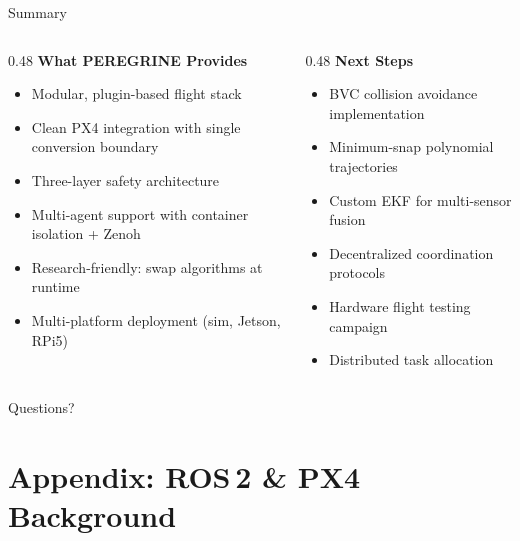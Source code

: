 \documentclass[aspectratio=169, 10pt]{beamer}
\begin{document}
\begin{frame}{Summary}
\begin{columns}[T]
\begin{column}{0.48\textwidth}
\textbf{What PEREGRINE Provides}
\begin{itemize}
  \item Modular, plugin-based flight stack
  \item Clean PX4 integration with single conversion boundary
  \item Three-layer safety architecture
  \item Multi-agent support with container isolation + Zenoh
  \item Research-friendly: swap algorithms at runtime
  \item Multi-platform deployment (sim, Jetson, RPi5)
\end{itemize}
\end{column}
\begin{column}{0.48\textwidth}
\textbf{Next Steps}
\begin{itemize}
  \item BVC collision avoidance implementation
  \item Minimum-snap polynomial trajectories
  \item Custom EKF for multi-sensor fusion
  \item Decentralized coordination protocols
  \item Hardware flight testing campaign
  \item Distributed task allocation
\end{itemize}
\end{column}
\end{columns}

\vspace{1em}
\centering
\large\alert{Questions?}
\end{frame}


\appendix
\section{Appendix: ROS\,2 \& PX4 Background}
\end{document}
